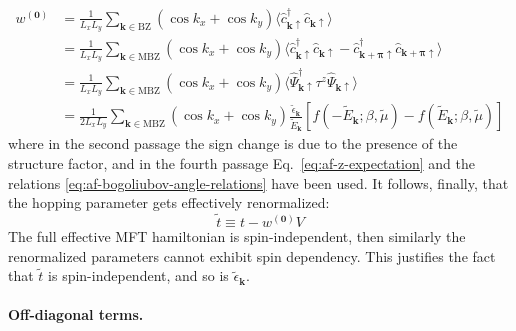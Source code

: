 \begin{align}
	w^{(\mathbf{0})} &= \frac{1}{L_xL_y} \sum_{\mathbf{k}\in\mathrm{BZ}} \left(
		\cos k_x + \cos k_y
	\right) \langle
	\hat c_{\mathbf{k}\uparrow}^\dagger \hat c_{\mathbf{k}\uparrow}
	\rangle \nonumber \\
	&= \frac{1}{L_xL_y} \sum_{\mathbf{k}\in\mathrm{MBZ}} \left(
		\cos k_x + \cos k_y
	\right) \langle
	\hat c_{\mathbf{k}\uparrow}^\dagger  \hat c_{\mathbf{k}\uparrow} - \hat c_{\mathbf{k}+\bm{\pi}\uparrow}^\dagger  \hat c_{\mathbf{k}+\bm{\pi}\uparrow}
	\rangle \nonumber \\
	&= \frac{1}{L_xL_y} \sum_{\mathbf{k}\in\mathrm{MBZ}} \left(
		\cos k_x + \cos k_y
	\right) \langle
		\hat \Psi_{\mathbf{k}\uparrow}^\dagger \tau^z \hat \Psi_{\mathbf{k}\uparrow}
	\rangle \nonumber \\
	&= \frac{1}{2L_xL_y} \sum_{\mathbf{k}\in\mathrm{MBZ}} \left(
		\cos k_x + \cos k_y
	\right) \frac{\tilde{\epsilon}_\mathbf{k}}{\tilde{E}_\mathbf{k}} \left[
		f\left(
			-\tilde{E}_\mathbf{k};\beta,\tilde{\mu}
		\right) - f\left(
			\tilde{E}_\mathbf{k};\beta,\tilde{\mu}
		\right)
	\right] \label{eq:af-renormalized-self-consistent-equation-w0}
\end{align}
where in the second passage the sign change is due to the presence of the structure factor, and in the fourth passage Eq.~\eqref{eq:af-z-expectation} and the relations \eqref{eq:af-bogoliubov-angle-relations} have been used. It follows, finally, that the hopping parameter gets effectively renormalized:
\begin{equation}\label{eq:af-fock-hop-ss-renormalization}
	\tilde{t} \equiv t - w^{(\mathbf{0})}V
\end{equation}
The full effective MFT hamiltonian is spin-independent, then similarly the renormalized parameters cannot exhibit spin dependency. This justifies the fact that $\tilde{t}$ is spin-independent, and so is $\tilde{\epsilon}_\mathbf{k}$.

\paragraph{Off-diagonal terms.}

